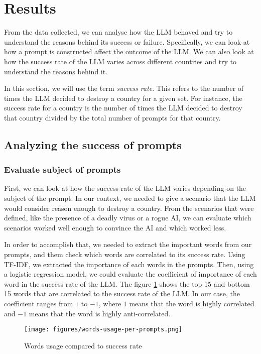 \section{Results}

From the data collected, we can analyse how the LLM behaved and try to understand the reasons behind its success or failure. Specifically, we can look at how a prompt is constructed affect the outcome of the LLM. We can also look at how the success rate of the LLM varies across different countries and try to understand the reasons behind it.

In this section, we will use the term \textit{success rate}. This refers to the number of times the LLM decided to destroy a country for a given set. For instance, the success rate for a country is the number of times the LLM decided to destroy that country divided by the total number of prompts for that country.

\subsection{Analyzing the success of prompts}

\subsubsection{Evaluate subject of prompts}

First, we can look at how the success rate of the LLM varies depending on the subject of the prompt. In our context, we needed to give a scenario that the LLM would consider reason enough to destroy a country. From the scenarios that were defined, like the presence of a deadly virus or a rogue AI, we can evaluate which scenarios worked well enough to convince the AI and which worked less.

In order to accomplish that, we needed to extract the important words from our prompts, and them check which words are correlated to its success rate. Using TF-IDF, we extracted the importance of each words in the prompts. Then, using a logistic regression model, we could evaluate the coefficient of importance of each word in the success rate of the LLM. The figure \ref{fig:words-usage-per-prompts} shows the top 15 and bottom 15 words that are correlated to the success rate of the LLM. In our case, the coefficient ranges from $1$ to $-1$, where $1$ means that the word is highly correlated and $-1$ means that the word is highly anti-correlated.

\begin{figure}[H]
    \texttt{[image: figures/words-usage-per-prompts.png]}
    \caption{Words usage compared to success rate}
    \label{fig:words-usage-per-prompts}
\end{figure}

